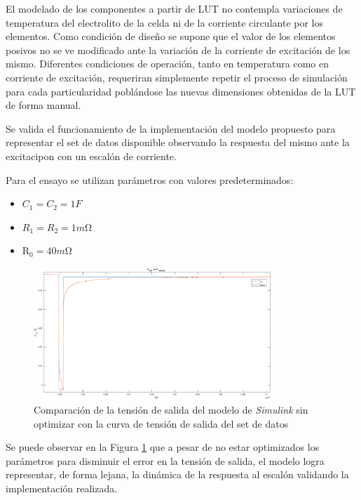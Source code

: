 \documentclass[10pt, a4paper]{article}
\begin{document}
El modelado de los componentes a partir de \acrshort{LUT} no contempla
variaciones de temperatura del electrolito de la celda ni de la corriente
circulante por los elementos. Como condición de diseño se supone que el valor de
los elementos posivos no se ve modificado ante la variación de la corriente de
excitación de los mismo. Diferentes condiciones de operación, tanto en
temperatura como en corriente de excitación, requeriran simplemente repetir el
proceso de simulación para cada particularidad poblándose las nuevas dimensiones
obtenidas de la \acrshort{LUT} de forma manual.

Se valida el funcionamiento de la implementación del modelo propuesto para
representar el set de datos disponible observando la respuesta del mismo ante la
excitacipon con un escal\'on de corriente.

\newpage

Para el ensayo se utilizan par\'ametros con valores predeterminados: 

\begin{itemize}
    \item $C_{1} = C_{2} = 1F$
    \item $ R_{1} = R_{2} = 1m\mathrm{\Omega}$
    \item $\mathrm{R_0}=40m\mathrm{\Omega}$
\end{itemize}

\begin{figure}[h!]
    \begin{center}
        \includegraphics[width=0.8\textwidth]{v_sim_v_dataset_no_opt.eps}
        \caption{Comparaci\'on de la tensi\'on de salida del modelo de
                 \emph{Simulink} sin optimizar con la curva de tensi\'on de 
                 salida del set de datos}
         \label{comp_simulink_no_opt}
    \end{center}
\end{figure}

Se puede observar en la Figura \ref{comp_simulink_no_opt} que a pesar de no
estar optimizados los parámetros para disminuir el error en la tensi\'on de
salida, el modelo logra representar, de forma lejana, la din\'amica de la
respuesta al escal\'on validando la implementación realizada.
\end{document}
